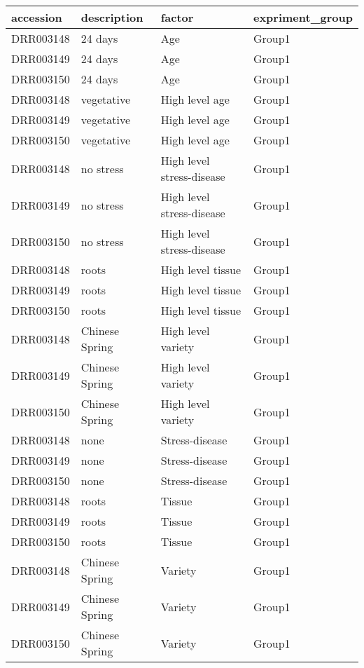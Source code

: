 \begin{tabular}{llll}
\toprule
 accession   & description    & factor                    & expriment\_group   \\
\midrule
 DRR003148   & 24 days        & Age                       & Group1            \\
 DRR003149   & 24 days        & Age                       & Group1            \\
 DRR003150   & 24 days        & Age                       & Group1            \\
 DRR003148   & vegetative     & High level age            & Group1            \\
 DRR003149   & vegetative     & High level age            & Group1            \\
 DRR003150   & vegetative     & High level age            & Group1            \\
 DRR003148   & no stress      & High level stress-disease & Group1            \\
 DRR003149   & no stress      & High level stress-disease & Group1            \\
 DRR003150   & no stress      & High level stress-disease & Group1            \\
 DRR003148   & roots          & High level tissue         & Group1            \\
 DRR003149   & roots          & High level tissue         & Group1            \\
 DRR003150   & roots          & High level tissue         & Group1            \\
 DRR003148   & Chinese Spring & High level variety        & Group1            \\
 DRR003149   & Chinese Spring & High level variety        & Group1            \\
 DRR003150   & Chinese Spring & High level variety        & Group1            \\
 DRR003148   & none           & Stress-disease            & Group1            \\
 DRR003149   & none           & Stress-disease            & Group1            \\
 DRR003150   & none           & Stress-disease            & Group1            \\
 DRR003148   & roots          & Tissue                    & Group1            \\
 DRR003149   & roots          & Tissue                    & Group1            \\
 DRR003150   & roots          & Tissue                    & Group1            \\
 DRR003148   & Chinese Spring & Variety                   & Group1            \\
 DRR003149   & Chinese Spring & Variety                   & Group1            \\
 DRR003150   & Chinese Spring & Variety                   & Group1            \\
\bottomrule
\end{tabular}

